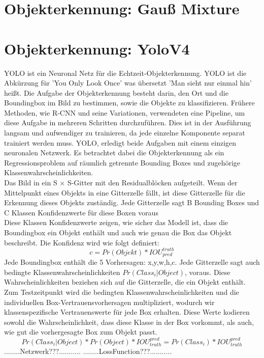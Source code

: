 \documentclass[conference]{IEEEtran}
\begin{document}
	\section{Objekterkennung: Gauß Mixture}
	
	\section{Objekterkennung: YoloV4}
	YOLO ist ein Neuronal Netz für die Echtzeit-Objekterkennung. YOLO ist die Abkürzung für 'You Only Look Once' was übersetzt 'Man sieht nur einmal hin' heißt. Die Aufgabe der Objekterkennung besteht darin, den Ort und die Boundingbox im Bild zu bestimmen, sowie die Objekte zu klassifizieren. Frühere Methoden, wie R-CNN und seine Variationen, verwendeten eine Pipeline, um diese Aufgabe in mehreren Schritten durchzuführen. Dies ist in der Ausführung langsam und aufwendiger zu trainieren, da jede einzelne Komponente separat trainiert werden muss. YOLO, erledigt beide Aufgaben mit einem einzigen neuronalen Netzwerk. Es betrachtet dabei die Objekterkennung als ein Regressionsproblem auf räumlich getrennte Bounding Boxes und zugehörige Klassenwahrscheinlichkeiten.\cite{b1}\\
	Das Bild in ein S × S-Gitter mit den Residualblöcken aufgeteilt. Wenn der Mittelpunkt eines Objekts in eine Gitterzelle fällt, ist diese Gitterzelle für die Erkennung dieses Objekts zuständig. Jede Gitterzelle sagt B Bounding Boxes und C Klassen Konfidenzwerte für diese Boxen voraus \cite{b1}\\
	Diese Klassen Konfidenzwerte zeigen, wie sicher das Modell ist, dass die Boundingbox ein Objekt enthält und auch wie genau die Box das Objekt beschreibt. Die Konfidenz wird wie folgt definiert:
	\[ c = Pr(Objekt) * IOU_{pred}^{truth} \]
	Jede Boundingbox enthält die 5 Vorhersagen: x,y,w,h,c.
	Jede Gitterzelle sagt auch bedingte Klassenwahrscheinlichkeiten $Pr(Class_{i}|Object)$, voraus.  Diese Wahrscheinlichkeiten beziehen sich auf die Gitterzelle, die ein Objekt enthält.
	Zum Testzeitpunkt wird die bedingten Klassenwahrscheinlichkeiten und die individuellen Box-Vertrauensvorhersagen multipliziert, wodurch wir klassenspezifische Vertrauenswerte für jede Box erhalten.  Diese Werte kodieren sowohl die Wahrscheinlichkeit, dass diese Klasse in der Box vorkommt, als auch, wie gut die vorhergesagte Box zum Objekt passt.
	\[ Pr(Class_{i}|Object)*Pr(Object)*IOU_{truth}^{pred}= Pr(Class_{i})*IOU_{truth}^{pred} \]
	........Netzwerk???...........
	........LossFunction???...........
	
\end{document}
